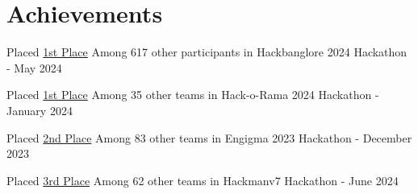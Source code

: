 \documentclass[a4paper,11pt]{article}
\newcommand{\resumeItem}[1]{
  \item\small{
    {#1 \vspace{-2pt}}
  }
}
\newcommand{\resumeSubItem}[1]{\resumeItem{#1}\vspace{-4pt}}
\newcommand{\resumeSubHeadingListStart}{\begin{itemize}[leftmargin=0.0in, label={}]}
\newcommand{\resumeSubHeadingListEnd}{\end{itemize}}
\begin{document}
\section{Achievements}
\begin{description}[font=$\bullet$]
\item {Placed \href{https://www.linkedin.com/posts/akash-singh-a57081253_everyoneisashark-hackbanglore-everyoneisashark-activity-7195865460859416577-k-Mu?utm_source=share&utm_medium=member_desktop}{1st Place} Among 617 other participants in Hackbanglore 2024 Hackathon - May 2024}
\vspace{-5pt}
\item {Placed \href{https://www.linkedin.com/posts/akash-singh-a57081253_hackorama-ai-ml-activity-7155577685312745472-r8Sm?utm_source=share&utm_medium=member_desktop}{1st Place} Among 35 other teams in Hack-o-Rama 2024 Hackathon - January 2024}
\vspace{-5pt}
\item {Placed \href{https://www.linkedin.com/posts/akash-singh-a57081253_enigma2023-hackathonwin-leadership-activity-7144367368339636224-ZRHx?utm_source=share&utm_medium=member_desktop}{2nd Place} Among 83 other teams in Engigma 2023 Hackathon - December 2023}
\vspace{-5pt}
\item {Placed \href{https://www.linkedin.com/posts/akash-singh-a57081253_hackmanv7-innovation-hackathon-activity-7207800224327626753-LTbG?utm_source=share&utm_medium=member_desktop}{3rd Place} Among 62 other teams in Hackmanv7 Hackathon - June 2024}
\vspace{-5pt}
\vspace{-5pt}

\end{description}

\end{document}

